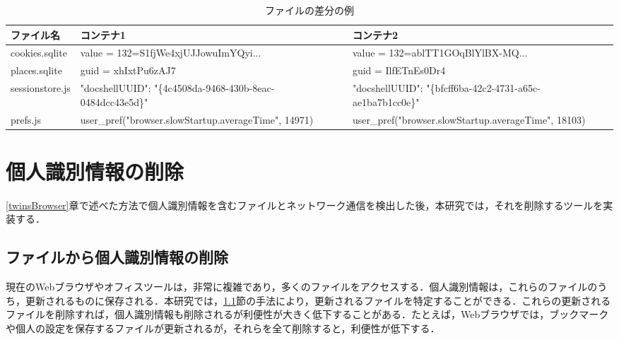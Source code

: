 \documentclass[submit,techrep]{ipsj}
\begin{document}
\begin{itemize}
\begin{table}[ht]



\caption{ファイルの差分の例}
\centering

\begin{tabular}{ |l|p{6cm}|p{6cm}| }

 \hline
 \footnotesize{ファイル名}　&\footnotesize{コンテナ1}　&\footnotesize{コンテナ2}\\
 \hline
 \footnotesize{cookies.sqlite} & \footnotesize{value = 132=S1fjWe4xjUJJowuImYQyi...} & \footnotesize{value = 132=ablTT1GOqBlYlBX-MQ...}\\
\hline
 \footnotesize{places.sqlite} & \footnotesize{guid = xhIxtPu6zAJ7} & \footnotesize{guid = IlfETnEs0Dr4}\\
\hline
 \footnotesize{sessionstore.js} & \footnotesize{"docshellUUID": "\{4c4508da-9468-430b-8eac- 0484dcc43e5d\}"} & \footnotesize{"docshellUUID": "\{bfcff6ba-42c2-4731-a65c- ae1ba7b1cc0e\}"}\\
 \hline
\footnotesize{prefs.js} & \footnotesize{user\_pref("browser.slowStartup.averageTime", 14971)} & \footnotesize{user\_pref("browser.slowStartup.averageTime", 18103)}\\
\hline
\end{tabular}
\label{fig:data}
\end{table}



\section{個人識別情報の削除}

\ref{twinsBrowser}章で述べた方法で個人識別情報を含むファイルとネットワーク通信を検出した後，本研究では，それを削除するツールを実装する．

\subsection{ファイルから個人識別情報の削除}

現在のWebブラウザやオフィスツールは，非常に複雑であり，多くのファイルをアクセスする．個人識別情報は，これらのファイルのうち，更新されるものに保存される．本研究では，\ref{}節の手法により，更新されるファイルを特定することができる．これらの更新されるファイルを削除すれば，個人識別情報も削除されるが利便性が大きく低下することがある．たとえば，Webブラウザでは，ブックマークや個人の設定を保存するファイルが更新されるが，それらを全て削除すると，利便性が低下する．


\end{itemize}
\end{document}
